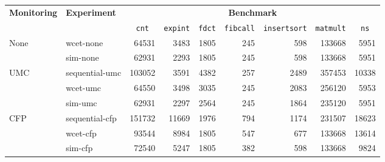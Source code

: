 
\begin{tabular}{|l|l||r|r|r|r|r|r|r|}
\hline

\multirow{2}{*}{\bf Monitoring}&\multirow{2}{*}{\bf Experiment}&\multicolumn{7}{c|}{\bf Benchmark}       \\ \cline{3-9}
&&\multicolumn{1}{c|}{\tt cnt}&\multicolumn{1}{c|}{\tt expint}&\multicolumn{1}{c|}{\tt fdct}&\multicolumn{1}{c|}{\tt fibcall}&\multicolumn{1}{c|}{\tt insertsort}&\multicolumn{1}{c|}{\tt matmult}&\multicolumn{1}{c|}{\tt ns} \\ \hline \hline
\multirow{2}{*}{None}&wcet-none&64531&3483&1805&245&598&133668&5951 \\ \cline{2-9}
&sim-none&62931&2293&1805&245&598&133668&5951 \\ \hline \hline
\multirow{3}{*}{UMC}&sequential-umc&103052&3591&4382&257&2489&357453&10338 \\ \cline{2-9}
&wcet-umc&64550&3498&3035&245&2083&256120&5953 \\ \cline{2-9}
&sim-umc&62931&2297&2564&245&1864&235120&5951 \\ \hline \hline
\multirow{3}{*}{CFP}&sequential-cfp&151732&11669&1976&794&1174&231507&18623 \\ \cline{2-9}
&wcet-cfp&93544&8984&1805&547&677&133668&13614 \\ \cline{2-9}
&sim-cfp&72540&5247&1805&382&598&133668&9824 \\ \hline

\end{tabular}
